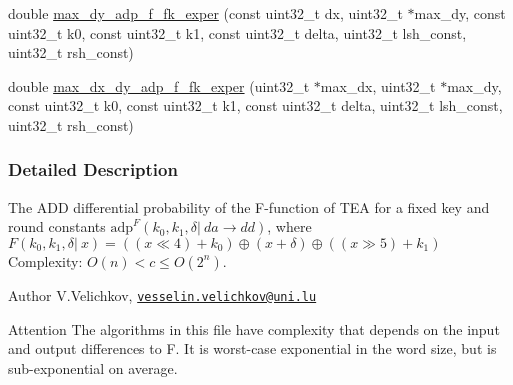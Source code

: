 \begin{DoxyCompactItemize}
\item 
double \hyperlink{adp-tea-f-fk_8cc_a299291aea5364cebb5c98d48d46aa169}{max\-\_\-dy\-\_\-adp\-\_\-f\-\_\-fk\-\_\-exper} (const uint32\-\_\-t dx, uint32\-\_\-t $\ast$max\-\_\-dy, const uint32\-\_\-t k0, const uint32\-\_\-t k1, const uint32\-\_\-t delta, uint32\-\_\-t lsh\-\_\-const, uint32\-\_\-t rsh\-\_\-const)
\item 
double \hyperlink{adp-tea-f-fk_8cc_af1d9960648819fb29344f13ed7e58611}{max\-\_\-dx\-\_\-dy\-\_\-adp\-\_\-f\-\_\-fk\-\_\-exper} (uint32\-\_\-t $\ast$max\-\_\-dx, uint32\-\_\-t $\ast$max\-\_\-dy, const uint32\-\_\-t k0, const uint32\-\_\-t k1, const uint32\-\_\-t delta, uint32\-\_\-t lsh\-\_\-const, uint32\-\_\-t rsh\-\_\-const)
\end{DoxyCompactItemize}


\subsubsection{\-Detailed \-Description}
\-The \-A\-D\-D differential probability of the \-F-\/function of \-T\-E\-A for a fixed key and round constants $\mathrm{adp}^{F}(k_0, k_1, \delta |~ da \rightarrow dd)$, where $ F(k_0, k_1, \delta |~ x) = ((x \ll 4) + k_0) \oplus (x + \delta) \oplus ((x \gg 5) + k_1)$ \-Complexity\-: $ O(n) < c \le O(2^n) $. \begin{DoxyAuthor}{\-Author}
\-V.\-Velichkov, \href{mailto:vesselin.velichkov@uni.lu}{\tt vesselin.\-velichkov@uni.\-lu} 
\end{DoxyAuthor}
\begin{DoxyAttention}{\-Attention}
\-The algorithms in this file have complexity that depends on the input and output differences to \-F. \-It is worst-\/case exponential in the word size, but is sub-\/exponential on average. 
\end{DoxyAttention}


